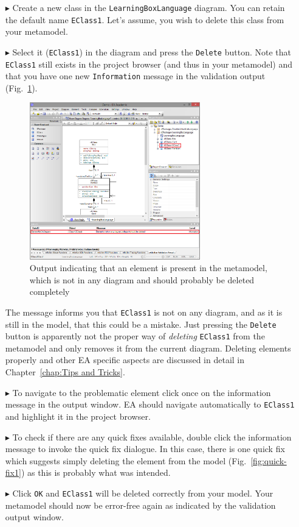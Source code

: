 \begin{enumerate}
\item[$\blacktriangleright$] Create a new class in the \texttt{Learning\-Box\-Language} diagram.
You can retain the default name \texttt{EClass1}.
Let's assume, you wish to delete this class from your metamodel.
\item[$\blacktriangleright$] Select it (\texttt{EClass1}) in the diagram and press the \texttt{Delete} button.
Note that \texttt{EClass1} still exists in the project browser (and thus in your metamodel) and that you have one new \texttt{Information} message in the validation output (Fig.~\ref{fig:validation_information}).

\begin{figure}[htbp]
	\centering
  \includegraphics[width=0.7\textwidth]{pics/memBoxBilder/memBox43}
	\caption{Output indicating that an element is present in the metamodel, which is not in any diagram and should probably be deleted completely}
	\label{fig:validation_information}
\end{figure}

The message informs you that \texttt{EClass1} is not on any diagram, and as it is still in the model, that this could be a mistake.
Just pressing the \texttt{Delete} button is apparently not the proper way of \emph{deleting} \texttt{EClass1} from the metamodel and only removes it from the current diagram.
Deleting elements properly and other EA specific aspects are discussed in detail in Chapter~\ref{chap:Tips and Tricks}.


\item[$\blacktriangleright$] To navigate to the problematic element click once on the information message in the output window.
EA should navigate automatically to \texttt{EClass1} and highlight it in the project browser.
\item[$\blacktriangleright$] To check if there are any quick fixes available, double click the information message to invoke the quick fix dialogue.
In this case, there is one quick fix which suggests simply deleting the element from the model (Fig.~\ref{fig:quick-fix1}) as this is probably what was intended.
\item[$\blacktriangleright$] Click \texttt{OK} and \texttt{EClass1} will be deleted correctly from your model.
Your metamodel should now be error-free again as indicated by the validation output window.


\end{enumerate}
